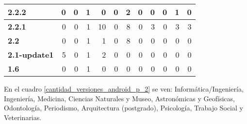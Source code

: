 \begin{table}[htbp]
{\begin{tabular}{|l|r|r|r|r|r|r|r|r|r|r|r|}
\textbf{2.2.2} & 0 & 0 & 1 & 0 & 0 & 2 & 0 & 0 & 0 & 1 & 0 \\ \hline
\textbf{2.2.1} & 0 & 0 & 1 & 10 & 0 & 8 & 0 & 3 & 0 & 3 & 3 \\ \hline
\textbf{2.2} & 0 & 0 & 1 & 1 & 0 & 8 & 0 & 0 & 0 & 0 & 0 \\ \hline
\textbf{2.1-update1} & 5 & 0 & 1 & 2 & 0 & 0 & 0 & 0 & 0 & 0 & 0 \\ \hline
\textbf{1.6} & 0 & 0 & 1 & 0 & 0 & 0 & 0 & 0 & 0 & 0 & 0 \\ \hline
\end{tabular} }
\label{cantidad_versiones_android_p_1}
\end{table}

En el cuadro \ref{cantidad_versiones_android_p_2} se ven: Informática/Ingeniería, Ingeniería, Medicina, Ciencias Naturales y Museo, Astronómicas y Geofísicas, Odontología, Periodismo, Arquitectura (postgrado), Psicología, Trabajo Social y Veterinarias.

